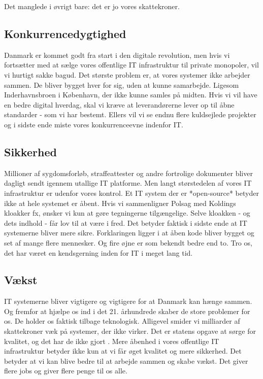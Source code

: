 \documentclass[fleqn]{article}
\begin{document}
Det manglede i øvrigt bare: det er jo vores skattekroner.

\subsection{Konkurrencedygtighed}
Danmark er kommet godt fra start i den digitale revolution, men hvis vi fortsætter
med at sælge vores offentlige IT infrastruktur til private monopoler, vil vi hurtigt sakke bagud.
Det største problem er, at vores systemer ikke arbejder sammen. De bliver bygget hver
for sig, uden at kunne samarbejde. Ligesom Inderhavnsbroen i København, der ikke kunne
samles på midten. %
Hvis vi vil have en bedre digital hverdag, skal vi kræve at leverandørerne lever op til 
åbne standarder - som vi har bestemt.
Ellers vil vi se endnu flere kuldsejlede projekter og i sidste ende miste vores
konkurrenceevne indenfor IT.

\subsection{Sikkerhed}
Millioner af sygdomsforløb, straffeattester og andre fortrolige
dokumenter bliver dagligt sendt igennem utallige IT platforme. Men langt størstedelen
af vores IT infrastruktur er udenfor vores kontrol.
Et IT system der er *open-source* betyder ikke at hele systemet er åbent. 
Hvis vi sammenligner Polsag med Koldings kloakker fx, ønsker vi kun at gøre tegningerne
tilgængelige. Selve kloakken - og dets indhold - får lov til at være i fred.
Det betyder faktisk i sidste ende at IT systemerne bliver mere sikre. Forklaringen ligger
i at åben kode bliver bygget og set af mange flere mennesker. Og fire øjne er som bekendt
bedre end to. Tro os, det har været en kendsgerning inden for IT i meget lang tid.

\subsection{Vækst}
IT systemerne bliver vigtigere og vigtigere for at Danmark kan hænge sammen. Og fremfor
at hjælpe os ind i det 21. århundrede skaber de store problemer for os. De holder os faktisk
tilbage teknologisk. Alligevel smider vi milliarder af skattekroner væk på systemer, der
ikke virker.
Det er statens opgave at sørge for kvalitet, og det har de ikke gjort \cite{Lauesen}.
Mere åbenhed i vores offentlige IT infrastruktur betyder ikke kun at vi får øget
kvalitet og mere sikkerhed. Det betyder at vi kan blive bedre til at arbejde sammen og
skabe vækst. Det giver flere jobs og giver flere penge til os alle.
\end{document}
